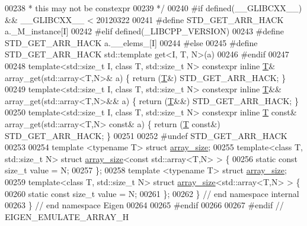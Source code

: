 \begin{DoxyCode}
00238 \textcolor{comment}{ *                       this may not be constexpr}
00239 \textcolor{comment}{ */}
00240 \textcolor{preprocessor}{#if defined(\_\_GLIBCXX\_\_) && \_\_GLIBCXX\_\_ < 20120322}
00241 \textcolor{preprocessor}{#define STD\_GET\_ARR\_HACK             a.\_M\_instance[I]}
00242 \textcolor{preprocessor}{#elif defined(\_LIBCPP\_VERSION)}
00243 \textcolor{preprocessor}{#define STD\_GET\_ARR\_HACK             a.\_\_elems\_[I]}
00244 \textcolor{preprocessor}{#else}
00245 \textcolor{preprocessor}{#define STD\_GET\_ARR\_HACK             std::template get<I, T, N>(a)}
00246 \textcolor{preprocessor}{#endif}
00247 
00248 \textcolor{keyword}{template}<std::\textcolor{keywordtype}{size\_t} I, \textcolor{keyword}{class} T, std::\textcolor{keywordtype}{size\_t} N> constexpr \textcolor{keyword}{inline} \hyperlink{group___sparse_core___module}{T}&       array\_get(std::array<T,N>&      
       a) \{ \textcolor{keywordflow}{return} (\hyperlink{group___sparse_core___module}{T}&)       STD\_GET\_ARR\_HACK; \}
00249 \textcolor{keyword}{template}<std::\textcolor{keywordtype}{size\_t} I, \textcolor{keyword}{class} T, std::\textcolor{keywordtype}{size\_t} N> constexpr \textcolor{keyword}{inline} \hyperlink{group___sparse_core___module}{T}&&      array\_get(std::array<T,N>&&     
       a) \{ \textcolor{keywordflow}{return} (\hyperlink{group___sparse_core___module}{T}&&)      STD\_GET\_ARR\_HACK; \}
00250 \textcolor{keyword}{template}<std::\textcolor{keywordtype}{size\_t} I, \textcolor{keyword}{class} T, std::\textcolor{keywordtype}{size\_t} N> constexpr \textcolor{keyword}{inline} \hyperlink{group___sparse_core___module}{T} \textcolor{keyword}{const}& array\_get(std::array<T,N> \textcolor{keyword}{const}&
       a) \{ \textcolor{keywordflow}{return} (\hyperlink{group___sparse_core___module}{T} \textcolor{keyword}{const}&) STD\_GET\_ARR\_HACK; \}
00251 
00252 \textcolor{preprocessor}{#undef STD\_GET\_ARR\_HACK}
00253 
00254 \textcolor{keyword}{template} <\textcolor{keyword}{typename} T> \textcolor{keyword}{struct }\hyperlink{struct_eigen_1_1internal_1_1array__size}{array\_size};
00255 \textcolor{keyword}{template}<\textcolor{keyword}{class} T, std::\textcolor{keywordtype}{size\_t} N> \textcolor{keyword}{struct }\hyperlink{struct_eigen_1_1internal_1_1array__size}{array\_size}<const std::array<T,N> > \{
00256   \textcolor{keyword}{static} \textcolor{keyword}{const} \textcolor{keywordtype}{size\_t} value = N;
00257 \};
00258 \textcolor{keyword}{template} <\textcolor{keyword}{typename} T> \textcolor{keyword}{struct }\hyperlink{struct_eigen_1_1internal_1_1array__size}{array\_size};
00259 \textcolor{keyword}{template}<\textcolor{keyword}{class} T, std::\textcolor{keywordtype}{size\_t} N> \textcolor{keyword}{struct }\hyperlink{struct_eigen_1_1internal_1_1array__size}{array\_size}<std::array<T,N> > \{
00260   \textcolor{keyword}{static} \textcolor{keyword}{const} \textcolor{keywordtype}{size\_t} value = N;
00261 \};
00262 \}  \textcolor{comment}{// end namespace internal}
00263 \}  \textcolor{comment}{// end namespace Eigen}
00264 
00265 \textcolor{preprocessor}{#endif}
00266 
00267 \textcolor{preprocessor}{#endif  // EIGEN\_EMULATE\_ARRAY\_H}
\end{DoxyCode}
